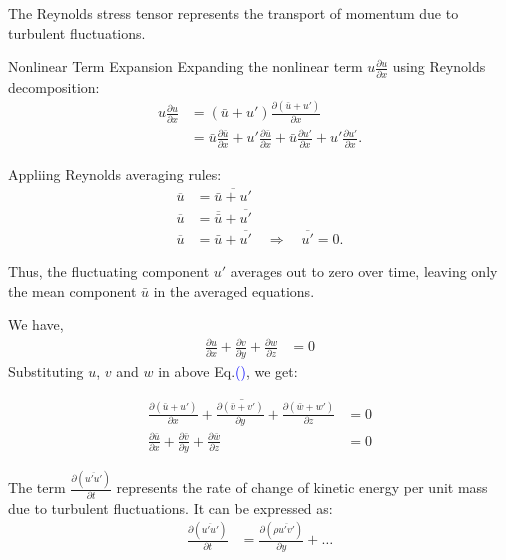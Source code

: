\documentclass[fleqn,10pt]{SelfArx} %
\newcommand{\myeqref}[1]{Eq.\textcolor{blue}{\textup{(\getrefnumber{#1})}}}
\begin{document}
The Reynolds stress tensor represents the transport of momentum due to turbulent fluctuations.

Nonlinear Term Expansion
Expanding the nonlinear term $u \frac{\partial u}{\partial x}$ using Reynolds decomposition:
\begin{align*}
	u \frac{\partial u}{\partial x} & = (\bar{u}+u') \frac{\partial(\bar{u}+u')}{\partial x}                                                                                                              \\
	                                & = \bar{u} \frac{\partial \bar{u}}{\partial x}+ u' \frac{\partial \bar{u}}{\partial x} + \bar{u} \frac{\partial u'}{\partial x} + u' \frac{\partial u'}{\partial x}.
\end{align*}

Appliing Reynolds averaging rules:
\begin{align*}
	\overline{u} & = \overline{\bar{u} + u'}                                            \\
	\overline{u} & = \overline{\bar{u}} + \overline{u'}                                 \\
	\overline{u} & = \bar{u} + \overline{u'} \quad \Rightarrow \quad \overline{u'} = 0.
\end{align*}

Thus, the fluctuating component $u'$ averages out to zero over time, leaving only the mean component $\bar{u}$ in the averaged equations.

We have,
\begin{align}
	\frac{\partial u}{\partial x} + \frac{\partial v}{\partial y} + \frac{\partial w}{\partial z} & =0 \tag{3.4} \label{eq:velocity}
\end{align}
Substituting $u$, $v$ and $w$ in above \myeqref{eq:velocity}, we get:

\begin{align*}
	\overline{\frac{\partial (\bar{u}+u')}{\partial x} + \frac{\partial (\bar{v}+v')}{\partial y} + \frac{\partial (\bar{w}+w')}{\partial z}} & =0                                     \\
	\frac{\partial \bar{u}}{\partial x} + \frac{\partial \bar{v}}{\partial y} + \frac{\partial \bar{w}}{\partial z}                           & =0 \tag{3.5} \label{eq:velocity_putub}
\end{align*}

The term $\frac{\partial(\overline{u'u'})}{\partial t}$ represents the rate of change of kinetic energy per unit mass due to turbulent fluctuations. It can be expressed as:
\begin{align*}
	\frac{\partial (\overline{u'u'})}{\partial t}
	 & = \frac{\partial \left( \rho \overline{u'v'} \right)}{\partial y} + \ldots
\end{align*}
\end{document}
